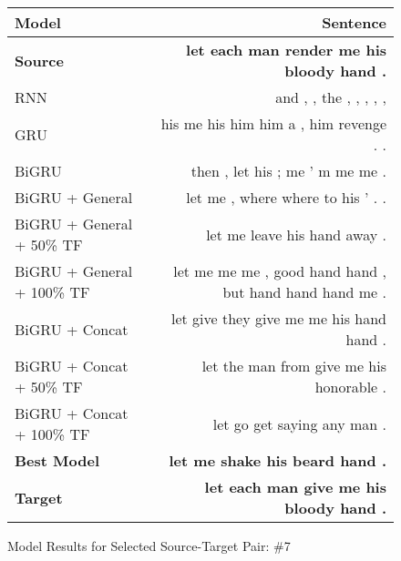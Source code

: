 \documentclass[twoside,twocolumn]{article}
\newlength\mystoreparindent
\newenvironment{myparindent}[1]{%
  \setlength{\mystoreparindent}{\the\parindent}
  \setlength{\parindent}{#1}
  }{%
  \setlength{\parindent}{\mystoreparindent}
}
\begin{document}
\begin{myparindent}{0pt}
\begin{figure}[ht!]
    \centering
    \begin{tabular}{ |l|r| }
        \hline
        \textbf{Model}
          & \textbf{Sentence} \\
        \hline
        \textbf{Source} & \textbf{let each man render me his bloody hand .} \\ \hline
        RNN & and , , the , , , , , \\ \hline
        GRU & his me his him him a , him revenge . . \\ \hline
        BiGRU & then , let his ; me ' m me me . \\ \hline
        BiGRU + General & let me , where where to his ’ . . \\ \hline
        BiGRU + General + 50\% TF & let me leave his hand away . \\ \hline
        BiGRU + General + 100\% TF & let me me me , good hand hand , but hand hand hand me . \\ \hline
        BiGRU + Concat & let give they give me me his hand hand . \\ \hline
        BiGRU + Concat + 50\% TF & let the man from give me his honorable . \\ \hline
        BiGRU + Concat + 100\% TF & let go get saying any man . \\ \hline
        \textbf{Best Model} & \textbf{let me shake his beard hand .} \\ \hline
        \textbf{Target} & \textbf{let each man give me his bloody hand .} \\ \hline
    \end{tabular}
    \caption{Model Results for Selected Source-Target Pair: \#7}
    \label{fig:model-results-7}
\end{figure}

\newpage

\end{myparindent}
\end{document}

